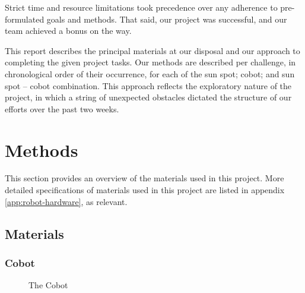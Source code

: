 \documentclass[a4paper,10pt]{article} %
\begin{document}
Strict time and resource limitations took precedence over any adherence
to pre-formulated goals and methods. That said, our project was successful,
and our team achieved a bonus on the way.

This report describes the principal materials at our disposal and our approach
to completing the given project tasks. Our methods are described per challenge,
in chronological order of their occurrence, for each of the sun spot; cobot; and
sun spot -- cobot combination. This approach reflects the exploratory nature of
the project, in which a string of unexpected obstacles dictated the structure of
our efforts over the past two weeks.


\pagebreak

\section{Methods} %

This section provides an overview of the materials used in this project. More
detailed specifications of materials used in this project are listed in appendix
\ref{app:robot-hardware}, as relevant.

\subsection{Materials} %

\subsubsection{Cobot}

\begin{figure}[h]
    \centering
    \caption{The Cobot}
    \label{fig:cobotviews}
\end{figure}
\end{document}
